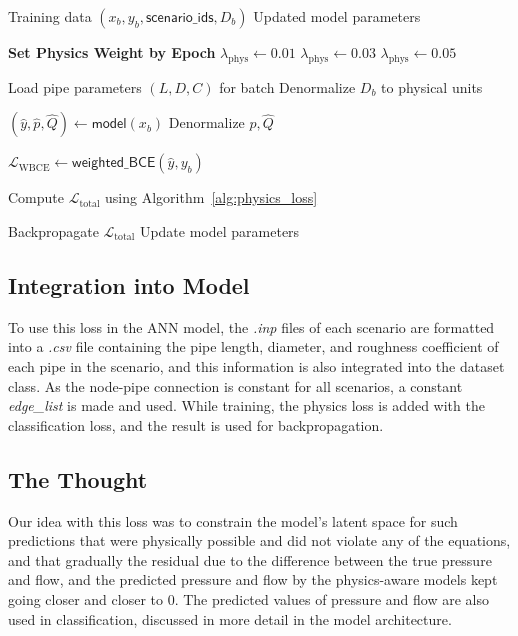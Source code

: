 \documentclass[final,5p,times,twocolumn,authoryear]{elsarticle}
\begin{document}
\begin{algorithm}[H]
\caption{Training Loop with Physics Loss}
\label{alg:training}
\begin{algorithmic}[2]

\Require Training data $(x_b, y_b, \mathsf{scenario\_ids}, D_b)$
\Ensure Updated model parameters

\State \textbf{Set Physics Weight by Epoch}
    \State $\lambda_{\mathrm{phys}} \gets 0.01$
    \State $\lambda_{\mathrm{phys}} \gets 0.03$
\Else
    \State $\lambda_{\mathrm{phys}} \gets 0.05$
\EndIf


    \State Load pipe parameters $(L,D,C)$ for batch
    \State Denormalize $D_b$ to physical units

    \State $(\hat{y}, \hat{p}, \hat{Q}) \gets \mathsf{model}(x_b)$
    \State Denormalize $\hat{p}, \hat{Q}$

    \State $\mathcal{L}_{\mathrm{WBCE}} \gets \mathsf{weighted\_BCE}(\hat{y}, y_b)$

    \State Compute $\mathcal{L}_{\mathrm{total}}$ using Algorithm~\ref{alg:physics_loss}

    \State Backpropagate $\mathcal{L}_{\mathrm{total}}$
    \State Update model parameters

\EndFor

\end{algorithmic}
\end{algorithm}


\subsection{Integration into Model}
To use this loss in the ANN model, the \textit{.inp} files of each scenario are formatted into a \textit{.csv} file containing the pipe length, diameter, and roughness coefficient of each pipe in the scenario, and this information is also integrated into the dataset class. As the node-pipe connection is constant for all scenarios, a constant \textit{edge\_list} is made and used. While training, the physics loss is added with the classification loss, and the result is used for backpropagation.

\subsection{The Thought}
Our idea with this loss was to constrain the model's latent space for such predictions that were physically possible and did not violate any of the equations, and that gradually the residual due to the difference between the true pressure and flow, and the predicted pressure and flow by the physics-aware models kept going closer and closer to 0. The predicted values of pressure and flow are also used in classification, discussed in more detail in the model architecture.
\end{document}
